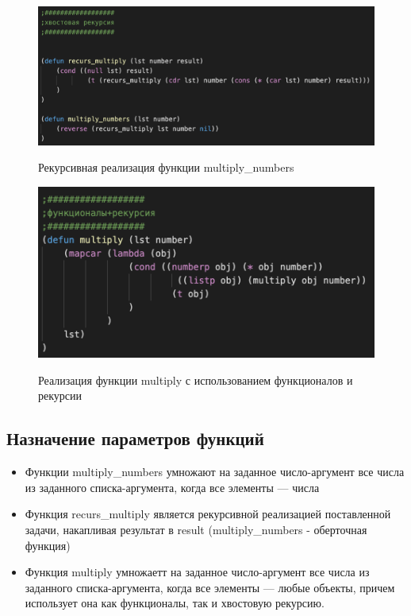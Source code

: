 \documentclass[a4paper,12pt]{article}
\begin{document}
  	\begin{figure}[h!]
 	\begin{center}
 		{\includegraphics[scale = 0.8]{5.7r.png}}
 		\label{ris:5.7r}
 	\end{center}
 \caption{Рекурсивная реализация функции multiply\_numbers}
 \end{figure}

 	\newpage

 	\begin{figure}[h!]
	\begin{center}
		{\includegraphics[scale = 1.0]{5.7rf.png}}
		\label{ris:5.7rf}
	\end{center}
\caption{Реализация функции multiply с использованием функционалов и рекурсии}
\end{figure}

 	
 	\subsection*{Назначение параметров функций}
 	
 	\begin{itemize}
 		\item Функции multiply\_numbers умножают на заданное число-аргумент все числа из заданного списка-аргумента, когда все элементы --- числа
 		\item Функция recurs\_multiply является рекурсивной реализацией поставленной задачи, накапливая результат в result (multiply\_numbers - оберточная функция)
 		\item Функция multiply умножаетт на заданное число-аргумент все числа из заданного списка-аргумента, когда все элементы --- любые объекты, причем использует она как функционалы, так и хвостовую рекурсию.
 	\end{itemize}
 	
\end{document}
